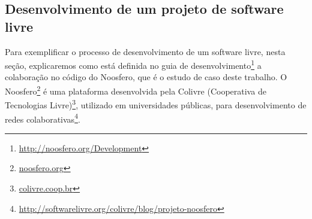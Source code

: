\begin{comment}
Umas das grandes conquistas de Stallman e da \emph{Fre Software Foudation} (FSF), 
principal organização dedicada a produção e à divulgação do software livre, 
foram o projeto GNU\footnote{\url{www.gnu.org}} e a licença de software General Public License (GPL).
%
O projeto GNU consistiu em desenvolver um sistema operacional baseado no sistema 
Unix, porém livre de código proprietário, proporcionando aos usuários do Unix um 
sistema totalmente compatível com o Unix, com seu código disponível para todos e 
a liberdade de buscar suporte e personalizações da forma que quisessem.
%
Com o GNU, também foi desenvolvida a GPL, licença que dá amparo legal e formaliza 
a ideologia de software livre, amplamente utilizada pelos software livres.
%
Em paralelo ao desenvolvimento do GNU, sem relação alguma com o projeto da FSF,
o finlandês Linus Torvalds iniciou o desenvolvimento de um núcleo de sistema operacional também baseado no Unix e deu o nome do núcleo Linux (\emph{Linux Kernel}), disponibilizando-o pela licença GNU GPL.
%
Assim, como o fato do projeto GNU ainda não ter seu núcleo pronto, foi promovida a integração entre GNU e Linux, resultando no sistema operacional GNU/Linux, amplamente utilizado até os dias de hoje, configurando o sucesso do processo empírico e colaborativo dos projetos de software livre.

\end{comment}

\subsection{Desenvolvimento de um projeto de software livre}
\label{sec:dev-noosfero}


Para exemplificar o processo de desenvolvimento de um software livre,
nesta seção, explicaremos como está definida no guia de desenvolvimento\footnote{\url{http://noosfero.org/Development}} a colaboração no código do Noosfero, que é o estudo de caso deste trabalho.
%
O Noosfero\footnote{\url{noosfero.org}} é uma plataforma desenvolvida pela Colivre (Cooperativa de Tecnologias Livre)\footnote{\url{colivre.coop.br}}, utilizado em universidades públicas, para desenvolvimento de redes colaborativas\footnote{\url{http://softwarelivre.org/colivre/blog/projeto-noosfero}}.

